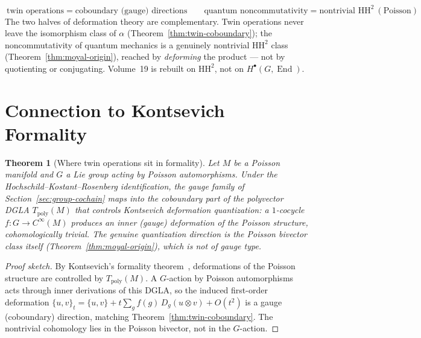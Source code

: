 \documentclass[11pt,a4paper,openany]{book}
\theoremstyle{plain}
\newtheorem{theorem}{Theorem}[chapter]
\theoremstyle{definition}
\newcommand{\groupG}{G}
\DeclareMathOperator{\End}{End}
\begin{document}
\begin{keyresult}
\[
\boxed{\ \text{twin operations}=\text{coboundary (gauge) directions}\qquad \text{quantum noncommutativity}=\text{nontrivial }\mathrm{HH}^2\ (\text{Poisson})\ }
\]
The two halves of deformation theory are complementary. Twin operations never leave the isomorphism class of $\alpha$ (Theorem~\ref{thm:twin-coboundary}); the noncommutativity of quantum mechanics is a genuinely nontrivial $\mathrm{HH}^2$ class (Theorem~\ref{thm:moyal-origin}), reached by \emph{deforming} the product --- not by quotienting or conjugating. Volume~19 is rebuilt on $\mathrm{HH}^2$, not on $H^\bullet(\groupG,\End)$.
\end{keyresult}

\section{Connection to Kontsevich Formality}\label{sec:kontsevich}

\begin{theorem}[Where twin operations sit in formality]\label{thm:kontsevich}
Let $M$ be a Poisson manifold and $\groupG$ a Lie group acting by Poisson automorphisms. Under the Hochschild--Kostant--Rosenberg identification, the gauge family of Section~\ref{sec:group-cochain} maps into the \emph{coboundary} part of the polyvector DGLA $T_{\mathrm{poly}}(M)$ that controls Kontsevich deformation quantization: a $1$-cocycle $f:\groupG\to C^\infty(M)$ produces an inner (gauge) deformation of the Poisson structure, cohomologically trivial. The genuine quantization direction is the Poisson bivector class itself (Theorem~\ref{thm:moyal-origin}), which is not of gauge type.
\end{theorem}

\begin{proof}[Proof sketch]
By Kontsevich's formality theorem~\cite{kontsevich2003}, deformations of the Poisson structure are controlled by $T_{\mathrm{poly}}(M)$. A $\groupG$-action by Poisson automorphisms acts through inner derivations of this DGLA, so the induced first-order deformation $\{u,v\}_t=\{u,v\}+t\sum_{g} f(g)\,D_g(u\otimes v)+O(t^2)$ is a gauge (coboundary) direction, matching Theorem~\ref{thm:twin-coboundary}. The nontrivial cohomology lies in the Poisson bivector, not in the $\groupG$-action.
\end{proof}
\end{document}
